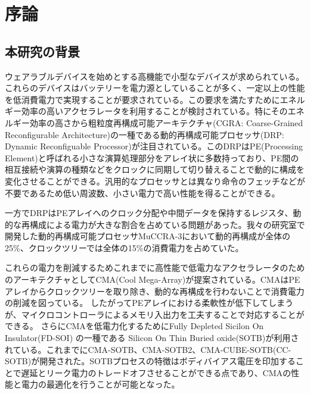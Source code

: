 \chapter{序論}
{
\label{chap:introduction}
\section{本研究の背景}
\label{sec:backgroud}
ウェアラブルデバイスを始めとする高機能で小型なデバイスが求められている。これらのデバイスはバッテリーを電力源としていることが多く、一定以上の性能を低消費電力で実現することが要求されている。この要求を満たすためにエネルギー効率の高いアクセラレータを利用することが検討されている。特にそのエネルギー効率の高さから粗粒度再構成可能アーキテクチャ(CGRA: Coarse-Grained Reconfigurable Architecture)の一種である動的再構成可能プロセッサ(DRP: Dynamic Reconfiguable Processor)が注目されている。このDRPはPE(Processing Element)と呼ばれる小さな演算処理部分をアレイ状に多数持っており、PE間の相互接続や演算の種類などをクロックに同期して切り替えることで動的に構成を変化させることができる。汎用的なプロセッサとは異なり命令のフェッチなどが不要であるため低い周波数、小さい電力で高い性能を得ることができる。

一方でDRPはPEアレイへのクロック分配や中間データを保持するレジスタ、動的な再構成による電力が大きな割合を占めている問題があった。我々の研究室で開発した動的再構成可能プロセッサMuCCRA-3において動的再構成が全体の25\%、クロックツリーでは全体の15\%の消費電力を占めていた。\cite{muccra}

これらの電力を削減するためこれまでに高性能で低電力なアクセラレータのためのアーキテクチャとしてCMA(Cool Mega-Array)が提案されている。\cite{cma_micro}CMAはPEアレイからクロックツリーを取り除き、動的な再構成を行わないことで消費電力の削減を図っている。
したがってPEアレイにおける柔軟性が低下してしまうが、マイクロコントローラによるメモリ入出力を工夫することで対応することができる。
さらにCMAを低電力化するためにFully Depleted Sicilon On Insulator(FD-SOI) の一種である Silicon On Thin Buried oxide(SOTB)が利用されている。これまでにCMA-SOTB\cite{cma-sotb}、CMA-SOTB2\cite{cma-sotb2}、CMA-CUBE-SOTB(CC-SOTB)\cite{cc-sotb}が開発された。SOTBプロセスの特徴はボディバイアス電圧を印加することで遅延とリーク電力のトレードオフさせることができる点であり、CMAの性能と電力の最適化を行うことが可能となった。

}
